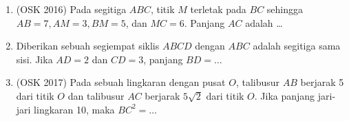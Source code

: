 \documentclass[11pt]{scrartcl}
\begin{document}
\begin{enumerate}
            \item (OSK 2016) Pada segitiga $ABC$, titik $M$ terletak pada $BC$ sehingga $AB=7, AM=3, BM=5$, dan $MC=6$. Panjang $AC$ adalah \dots
            
            \item Diberikan sebuah segiempat siklis $ABCD$ dengan $ABC$ adalah segitiga sama sisi. Jika $AD=2$ dan $CD=3$, panjang $BD=\dots$
            
            \item (OSK 2017) Pada sebuah lingkaran dengan pusat $O$, talibusur $AB$ berjarak 5 dari titik $O$ dan talibusur $AC$ berjarak $5\sqrt{2}$ dari titik $O$. Jika panjang jari-jari lingkaran 10, maka $BC^2=\dots$
\end{enumerate}
    
\end{document}
